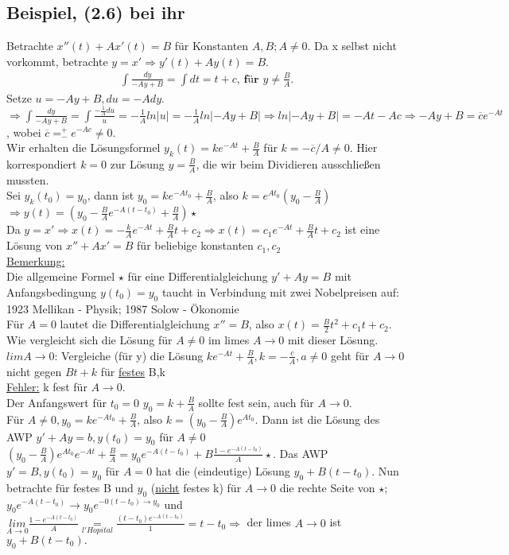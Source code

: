 \documentclass[12pt,a4paper]{article}
\newcommand{\DGL}{Differentialgleichung }
\begin{document}
\subsection{Beispiel, (2.6) bei ihr}
Betrachte $x''(t) + Ax'(t) = B$ für Konstanten $A,B; A \neq 0$. Da x selbst nicht vorkommt, betrachte $y=x' \Rightarrow y'(t) + Ay(t) = B$.
\begin{align*}
\int \frac{dy}{-Ay+B} = \int dt = t+c \textbf{, für } y \neq \frac{B}{A}.
\end{align*}
Setze $u=-Ay+B, du=-Ady$.
$\Rightarrow \int \frac{dy}{-Ay+B} = \int \frac{-\frac{1}{A}du}{u} = -\frac{1}{A} ln|u| = -\frac{1}{A} ln|-Ay+B| \Rightarrow ln|-Ay+B| = -At-Ac \Rightarrow -Ay+B=\overline{c}e^{-At}$, wobei $\overline{c} = ^+_- e^{-Ac} \neq 0$. \\
Wir erhalten die Lösungsformel $y_k(t) = ke^{-At} + \frac{B}{A}$ für $k=-\overline{c}/A \neq 0$. Hier korrespondiert $k=0$ zur Lösung $y=\frac{B}{A}$, die wir beim Dividieren ausschließen mussten. \\

Sei $y_k(t_0) = y_0$, dann ist $y_0 = ke^{-At_0} + \frac{B}{A}$, also $k=e^{At_0}(y_0-\frac{B}{A})$ \\
$\Rightarrow y(t) = (y_0 - \frac{B}{A}e^{-A(t-t_0)} + \frac{B}{A}) \star$ \\
Da $y=x' \Rightarrow x(t) = -\frac{k}{A} e^{-At} + \frac{B}{A} t + c_2 \Rightarrow x(t) = c_1 e^{-At} + \frac{B}{A} t + c_2$ ist eine Lösung von $x''+Ax'=B$ für beliebige konstanten $c_1, c_2$ \\
\underline{Bemerkung:} \\
Die allgemeine Formel $\star$ für eine \DGL $y'+Ay=B$ mit Anfangsbedingung $y(t_0) = y_0$ taucht in Verbindung mit zwei Nobelpreisen auf: 1923 Mellikan - Physik; 1987 Solow - Ökonomie \\
Für $A=0$ lautet die \DGL $x''= B$, also $x(t) = \frac{B}{2}t^2 + c_1 t + c_2$. \\
Wie vergleicht sich die Lösung für $A \neq 0$ im limes $A \rightarrow 0$ mit dieser Lösung. \\
\underline{$lim A \rightarrow 0$}: Vergleiche (für y) die Lösung $ke^{-At} + \frac{B}{A}, k = -\frac{c}{A}, a \neq 0$ geht für $A \rightarrow 0$ nicht gegen $Bt+k$ für \underline{festes} B,k \\
\underline{Fehler:} k fest für $A \rightarrow 0$. \\
Der Anfangswert für $t_0 = 0$ $y_0 = k + \frac{B}{A}$ sollte fest sein, auch für $A \rightarrow 0$. \\
Für $A \neq 0, y_0 = ke^{-At_0} + \frac{B}{A}$, also $k = (y_0 - \frac{B}{A}) e^{At_0}$. Dann ist die Lösung des AWP $y'+Ay=b, y(t_0)=y_0$ für $A \neq 0$ $(y_0-\frac{B}{A})e^{At_0}e^{-At} + \frac{B}{A} = y_0 e^{-A(t-t_0)} + B \frac{1-e^{-A(t-t_0)}}{A} \star$. Das AWP $y'=B, y(t_0) = y_0$ für $A = 0$ hat die (eindeutige) Lösung $y_0 + B(t-t_0)$. Nun betrachte für festes B und $y_0$ (\underline{nicht} festes k) für $A \rightarrow 0$ die rechte Seite von $\star$; $y_0e^{-A(t-t_0)} \rightarrow y_0e^{-0(t-t_0) \rightarrow y_0}$ und $\underset{A \rightarrow 0}{lim} \frac{1-e^{-A(t-t_0)}}{A} \underset{l'Hopital}{=} \frac{(t-t_0)e^{-A(t-t_0)}}{1} = t-t_0 \Rightarrow$ der limes $A \rightarrow 0$ ist $y_0+B(t-t_0).$
\end{document}
